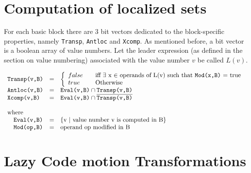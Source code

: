 \appendix

\chapter{Computation of localized sets}
For each basic block there are 3 bit vectors dedicated to the block-specific
properties, namely \texttt{Transp}, \texttt{Antloc} and \texttt{Xcomp}. As
mentioned before, a bit vector is a boolean array of value numbers.  Let the
leader expression (as defined in the section on value numbering) associated
with the value number $v$ be called $L(v)$. 


\begin{equation}
\begin{array}{l c l}
\texttt{Transp(v,B)} &=& \left\{
                    \begin{array}{l l}
                        false & \quad \text{iff $\exists$ x $\in$ operands of L(v) such that \texttt{Mod(x,B)} = true}\\
                        true & \quad \text{Otherwise}
                    \end{array} \right. \\
\texttt{Antloc(v,B)} &=& \texttt{Eval(v,B)} \cap \texttt{Transp(v,B)} \\
\texttt{Xcomp(v,B)} &=& \texttt{Eval(v,B)} \cap \overline{\texttt{Transp(v,B)}}\\
  &&\\
\text{where}&& \\  
\quad \texttt{Eval(v,B)} &=& \text{\{v $|$ value number v is computed in B\}}\\
\quad \texttt{Mod(op,B)} &=& \text{operand op modified in B}\\
\end{array}
\end{equation}

\chapter{Lazy Code motion Transformations}

